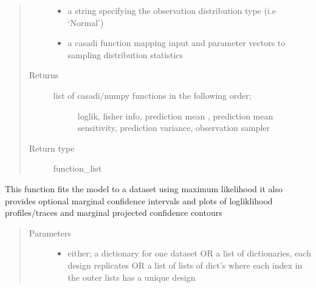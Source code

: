 \documentclass[letterpaper,10pt,english,openany,oneside]{sphinxmanual}
\begin{document}
\begin{fulllineitems}
\begin{fulllineitems}
\begin{quote}
\begin{description}
\begin{itemize}
\item {} 
 \textendash{} a string specifying the observation distribution type (i.e ‘Normal’)

\item {} 
 \textendash{} a casadi function mapping input and parameter vectors to sampling distribution statistics

\end{itemize}

\item[{Returns}] \leavevmode
\begin{description}
\item[{list of casadi/numpy functions in the following order;}] \leavevmode
loglik, fisher info, prediction mean , prediction mean sensitivity,
prediction variance, observation sampler

\end{description}


\item[{Return type}] \leavevmode
function\_list

\end{description}\end{quote}

\end{fulllineitems}


\begin{fulllineitems}
\label{\detokenize{nloed:nloed.model.Model.fit}}
This function fits the model to a dataset using maximum likelihood
it also provides optional marginal confidence intervals
and plots of logliklihood profiles/traces and marginal projected confidence contours
\begin{quote}\begin{description}
\item[{Parameters}] \leavevmode\begin{itemize}
\item {} 
 \textendash{} either; a dictionary for one dataset OR a list of dictionaries,  each design replicates OR a list of lists of dict’s where each index in the outer lists has a unique design


\end{itemize}
\end{description}
\end{quote}
\end{fulllineitems}
\end{fulllineitems}
\end{document}
